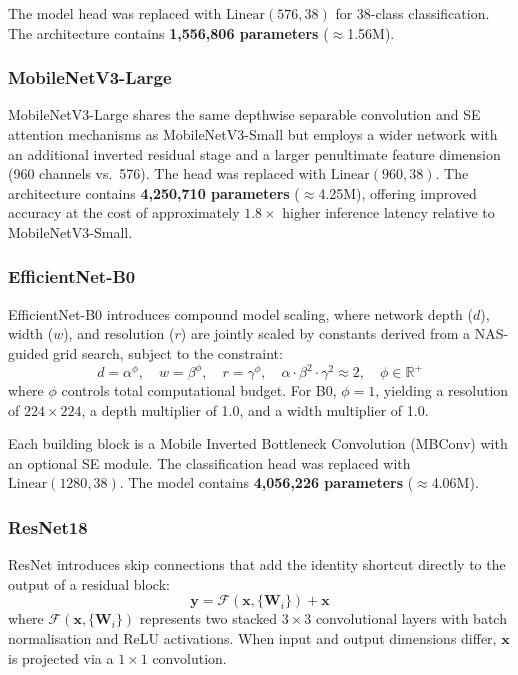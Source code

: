 \documentclass[pdflatex,sn-mathphys-num]{sn-jnl}
\theoremstyle{thmstyleone}%
\theoremstyle{thmstyletwo}%
\theoremstyle{thmstylethree}%
\begin{document}
The model head was replaced with $\text{Linear}(576, 38)$ for 38-class classification.
The architecture contains \textbf{1{,}556{,}806 parameters} ($\approx$1.56M).

\subsubsection{MobileNetV3-Large}

MobileNetV3-Large \citep{howard2019mobilenetv3} shares the same depthwise separable
convolution and SE attention mechanisms as MobileNetV3-Small but employs a wider
network with an additional inverted residual stage and a larger penultimate feature
dimension (960 channels vs.\ 576). The head was replaced with $\text{Linear}(960, 38)$.
The architecture contains \textbf{4{,}250{,}710 parameters} ($\approx$4.25M), offering
improved accuracy at the cost of approximately $1.8\times$ higher inference latency
relative to MobileNetV3-Small.

\subsubsection{EfficientNet-B0}

EfficientNet-B0 \citep{tan2019efficientnet} introduces compound model scaling, where
network depth ($d$), width ($w$), and resolution ($r$) are jointly scaled by constants
derived from a NAS-guided grid search, subject to the constraint:
\begin{equation}
  d = \alpha^\phi, \quad w = \beta^\phi, \quad r = \gamma^\phi, \quad
  \alpha \cdot \beta^2 \cdot \gamma^2 \approx 2, \quad \phi \in \mathbb{R}^+
  \label{eq:compound_scaling}
\end{equation}
where $\phi$ controls total computational budget. For B0, $\phi = 1$, yielding a
resolution of $224\times224$, a depth multiplier of 1.0, and a width multiplier of 1.0.

Each building block is a Mobile Inverted Bottleneck Convolution (MBConv) with an
optional SE module. The classification head was replaced with
$\text{Linear}(1280, 38)$. The model contains \textbf{4{,}056{,}226 parameters}
($\approx$4.06M).

\subsubsection{ResNet18}

ResNet \citep{he2016resnet} introduces skip connections that add the identity shortcut
directly to the output of a residual block:
\begin{equation}
  \mathbf{y} = \mathcal{F}(\mathbf{x}, \{\mathbf{W}_i\}) + \mathbf{x}
  \label{eq:residual}
\end{equation}
where $\mathcal{F}(\mathbf{x}, \{\mathbf{W}_i\})$ represents two stacked
$3\times3$ convolutional layers with batch normalisation and ReLU activations. When
input and output dimensions differ, $\mathbf{x}$ is projected via a $1\times1$
convolution.
\end{document}
